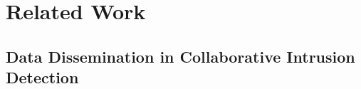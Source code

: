 \documentclass[../../main.tex]{subfiles}
\begin{document}
\chapter{Related Work}
\newpage
\section{Data Dissemination in Collaborative Intrusion Detection}






\end{document}
